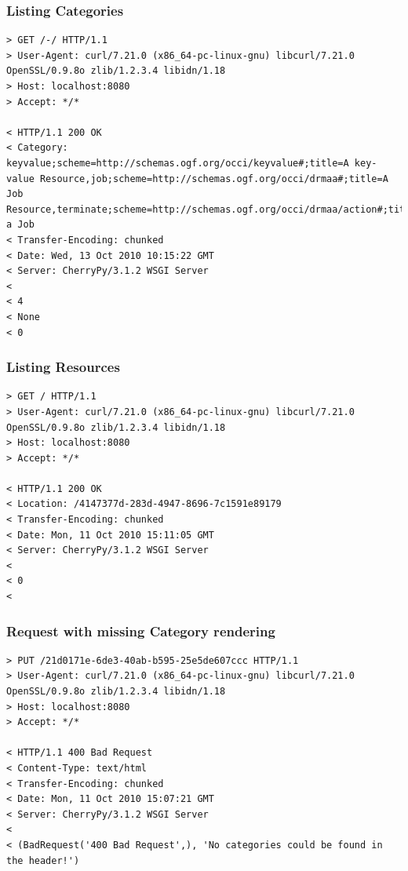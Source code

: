\documentclass[10pt,a4paper]{article}
\begin{document}
\subsubsection{Listing Categories}

\begin{verbatim}
> GET /-/ HTTP/1.1
> User-Agent: curl/7.21.0 (x86_64-pc-linux-gnu) libcurl/7.21.0 OpenSSL/0.9.8o zlib/1.2.3.4 libidn/1.18
> Host: localhost:8080
> Accept: */*

< HTTP/1.1 200 OK
< Category: keyvalue;scheme=http://schemas.ogf.org/occi/keyvalue#;title=A key-value Resource,job;scheme=http://schemas.ogf.org/occi/drmaa#;title=A Job Resource,terminate;scheme=http://schemas.ogf.org/occi/drmaa/action#;title=Terminate a Job
< Transfer-Encoding: chunked
< Date: Wed, 13 Oct 2010 10:15:22 GMT
< Server: CherryPy/3.1.2 WSGI Server
< 
< 4
< None
< 0
\end{verbatim}

\subsubsection{Listing Resources}

\begin{verbatim}
> GET / HTTP/1.1
> User-Agent: curl/7.21.0 (x86_64-pc-linux-gnu) libcurl/7.21.0 OpenSSL/0.9.8o zlib/1.2.3.4 libidn/1.18
> Host: localhost:8080
> Accept: */*

< HTTP/1.1 200 OK
< Location: /4147377d-283d-4947-8696-7c1591e89179
< Transfer-Encoding: chunked
< Date: Mon, 11 Oct 2010 15:11:05 GMT
< Server: CherryPy/3.1.2 WSGI Server
<
< 0
<
\end{verbatim}

\subsubsection{Request with missing Category rendering}

\begin{verbatim}
> PUT /21d0171e-6de3-40ab-b595-25e5de607ccc HTTP/1.1
> User-Agent: curl/7.21.0 (x86_64-pc-linux-gnu) libcurl/7.21.0 OpenSSL/0.9.8o zlib/1.2.3.4 libidn/1.18
> Host: localhost:8080
> Accept: */*

< HTTP/1.1 400 Bad Request
< Content-Type: text/html
< Transfer-Encoding: chunked
< Date: Mon, 11 Oct 2010 15:07:21 GMT
< Server: CherryPy/3.1.2 WSGI Server
< 
< (BadRequest('400 Bad Request',), 'No categories could be found in the header!')
\end{verbatim}
\end{document}
